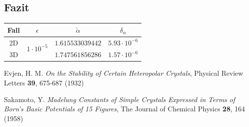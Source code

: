 \documentclass[10pt,a4paper]{article}
\begin{document}
\subsection{Fazit}

\begin{table}[h]
\begin{tabular}{|c|c|c|c|}
\hline
Fall & $\epsilon$                       & $\tilde{\alpha}$ & $\delta_\alpha$    \\ \hline
2D   & \multirow{2}{*}{$1\cdot10^{-5}$} & $1.615533039442$ & $5.93\cdot10^{-6}$ \\ \cline{1-1} \cline{3-4} 
3D   &                                  & $1.747561856286$ & $1.57\cdot10^{-6}$ \\ \hline
\end{tabular}
\end{table}

\begin{thebibliography}{9}

Evjen, H. M.
\emph{On the Stability of Certain Heteropolar Crystals},
Physical Review Letters \textbf{39},
675-687 (1932)

Sakamoto, Y.
\emph{Madelung Constants of Simple Crystals Expressed in Terms of Born's Basic
Potentials of 15 Figures},
The Journal of Chemical Physics \textbf{28},
164 (1958)

\end{thebibliography}
\end{document}
